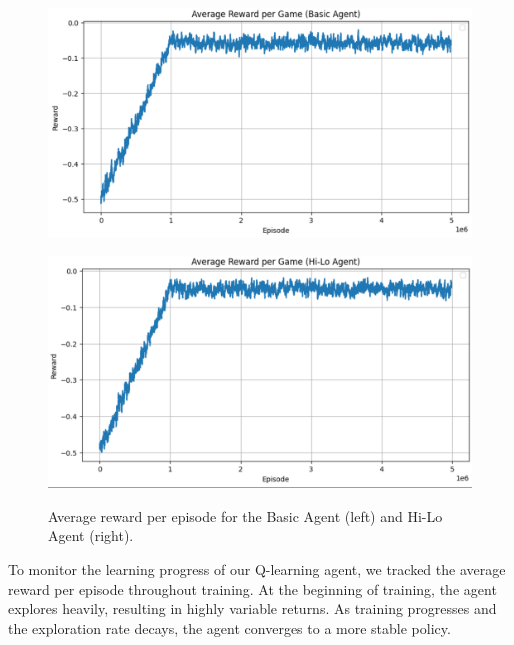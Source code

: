 \documentclass{article}
\begin{document}
\begin{figure}[h!]
  \centering
  \begin{minipage}{0.48\textwidth}
    \centering
    \includegraphics[width=\linewidth]{Images/rew_basic.png}
    \label{fig:basic_agent_profit}
  \end{minipage}\hfill
  \begin{minipage}{0.48\textwidth}
    \centering
    \includegraphics[width=\linewidth]{Images/rew_hilo.png}
    \label{fig:hilo_agent_profit}
  \end{minipage}
  \caption{Average reward per episode for the Basic Agent (left) and Hi-Lo Agent (right).}
\end{figure}

\noindent To monitor the learning progress of our Q-learning agent, 
we tracked the average reward per episode throughout training.
At the beginning of training, the agent explores heavily, 
resulting in highly variable returns. 
As training progresses and the exploration rate decays, 
the agent converges to a more stable policy.\\\\
\end{document}
